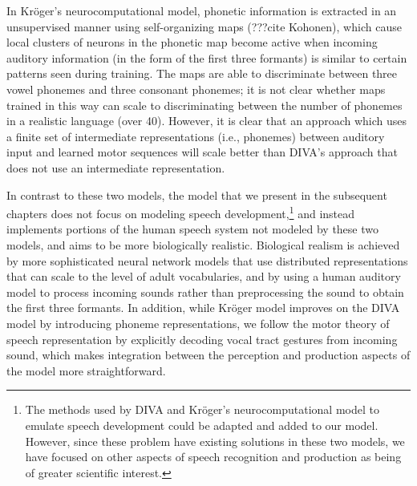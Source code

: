 In Kr\"{o}ger's neurocomputational model,
phonetic information is extracted
in an unsupervised manner
using self-organizing maps
(???cite Kohonen),
which cause
local clusters of neurons
in the phonetic map become active
when incoming auditory information
(in the form of the first three formants)
is similar to certain patterns
seen during training.
The maps are able to
discriminate between three vowel phonemes
and three consonant phonemes;
it is not clear whether
maps trained in this way
can scale to discriminating
between the number of phonemes
in a realistic language (over 40).
However, it is clear that an approach
which uses a finite set of intermediate representations
(i.e., phonemes)
between auditory input
and learned motor sequences
will scale better than DIVA's approach
that does not use an intermediate representation.

In contrast to these two models,
the model that we present
in the subsequent chapters does not focus on
modeling speech development,\footnote{
  The methods used by DIVA and Kr\"{o}ger's
  neurocomputational model to emulate
  speech development could be adapted
  and added to our model.
  However, since these problem have existing
  solutions in these two models,
  we have focused on other aspects
  of speech recognition and production
  as being of greater scientific interest.}
and instead implements
portions of the human speech system
not modeled by these two models,
and aims to be more biologically realistic.
Biological realism is achieved
by more sophisticated neural network models
that use distributed representations
that can scale to the level
of adult vocabularies,
and by using a human auditory model
to process incoming sounds
rather than preprocessing the sound
to obtain the first three formants.
In addition, while Kr\"{o}ger model
improves on the DIVA model by
introducing phoneme representations,
we follow the motor theory
of speech representation by
explicitly decoding vocal tract gestures
from incoming sound,
which makes integration between
the perception and production aspects
of the model more straightforward.


